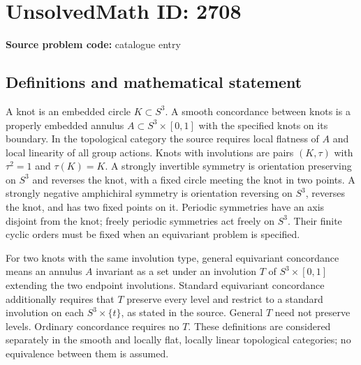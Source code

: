 \documentclass[11pt]{article}
\begin{document}
\section*{UnsolvedMath ID: 2708}
\textbf{Source problem code:} catalogue entry
\subsection{Definitions and mathematical statement}
A knot is an embedded circle $K\subset S^3$. A smooth concordance between knots is a properly embedded annulus $A\subset S^3\times[0,1]$ with the specified knots on its boundary. In the topological category the source requires local flatness of $A$ and local linearity of all group actions. Knots with involutions are pairs $(K,\tau)$ with $\tau^2=1$ and $\tau(K)=K$. A strongly invertible symmetry is orientation preserving on $S^3$ and reverses the knot, with a fixed circle meeting the knot in two points. A strongly negative amphichiral symmetry is orientation reversing on $S^3$, reverses the knot, and has two fixed points on it. Periodic symmetries have an axis disjoint from the knot; freely periodic symmetries act freely on $S^3$. Their finite cyclic orders must be fixed when an equivariant problem is specified.

For two knots with the same involution type, general equivariant concordance means an annulus $A$ invariant as a set under an involution $T$ of $S^3\times[0,1]$ extending the two endpoint involutions. Standard equivariant concordance additionally requires that $T$ preserve every level and restrict to a standard involution on each $S^3\times\{t\}$, as stated in the source. General $T$ need not preserve levels. Ordinary concordance requires no $T$. These definitions are considered separately in the smooth and locally flat, locally linear topological categories; no equivalence between them is assumed.
\end{document}
